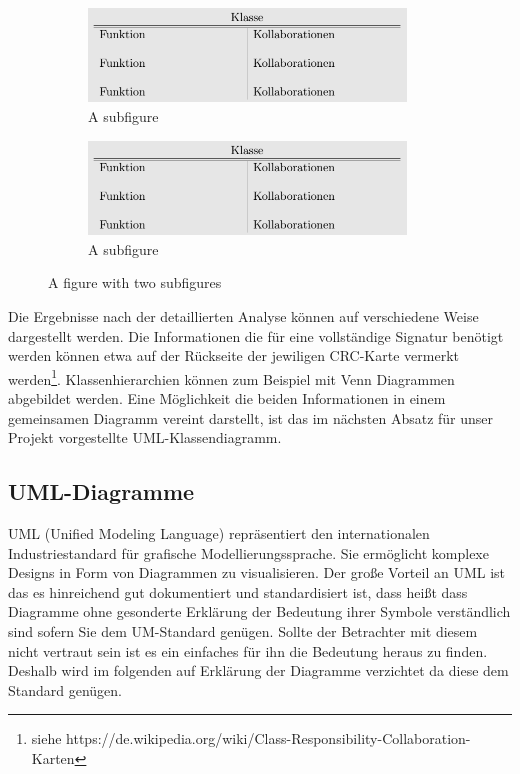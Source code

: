 \documentclass[11pt,a4paper]{article}
\begin{document}
\begin{figure}
\centering
\begin{subfigure}{.5\textwidth}
  \centering
  \includegraphics[width=.95\linewidth,height=2.5cm]{CRC.png}
  \caption{A subfigure}
  \label{fig:sub1}
\end{subfigure}%
\begin{subfigure}{.5\textwidth}
  \centering
  \includegraphics[width=.95\linewidth,height=2.5cm]{CRC.png}
  \caption{A subfigure}
  \label{fig:sub2}
\end{subfigure}
\caption{A figure with two subfigures}
\label{fig:test}
\end{figure}


Die Ergebnisse nach der detaillierten Analyse können auf verschiedene Weise dargestellt werden. Die Informationen die für eine vollständige Signatur benötigt werden können etwa auf der Rückseite der jewiligen CRC-Karte vermerkt werden\footnote{siehe https://de.wikipedia.org/wiki/Class-Responsibility-Collaboration-Karten}. Klassenhierarchien können zum Beispiel mit Venn Diagrammen abgebildet werden. Eine Möglichkeit die beiden Informationen in einem gemeinsamen Diagramm vereint darstellt, ist das im nächsten Absatz für unser Projekt vorgestellte UML-Klassendiagramm. 

\subsection{UML-Diagramme}
UML (Unified Modeling Language) repräsentiert den internationalen Industriestandard für grafische Modellierungssprache. Sie ermöglicht komplexe Designs in Form von Diagrammen zu visualisieren.
Der große Vorteil an UML ist das es hinreichend gut dokumentiert und standardisiert ist, dass heißt dass Diagramme ohne gesonderte Erklärung der Bedeutung ihrer Symbole verständlich sind sofern Sie dem UM-Standard genügen. Sollte der Betrachter mit diesem nicht vertraut sein ist es ein einfaches für ihn die Bedeutung heraus zu finden. Deshalb wird im folgenden auf Erklärung der Diagramme verzichtet da diese dem Standard genügen.  
\end{document}
